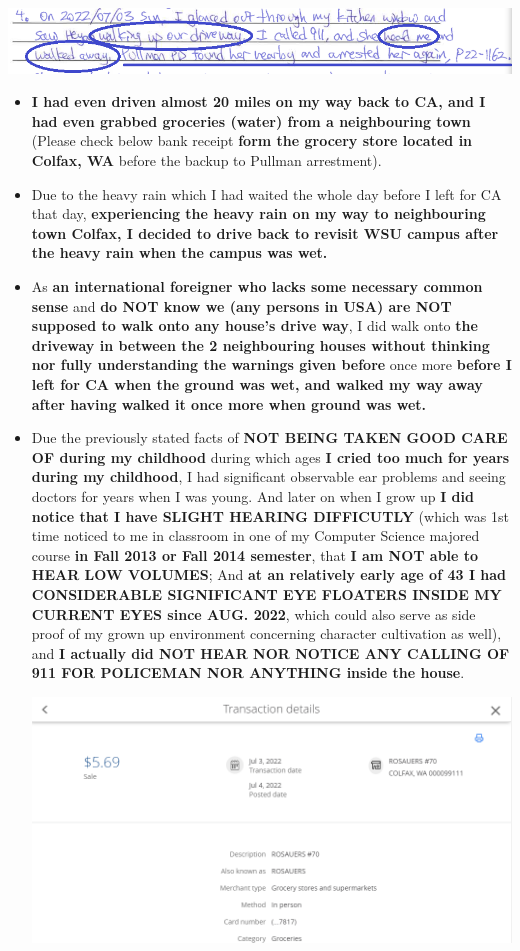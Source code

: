 \documentclass[9pt, b5paper]{article}
\begin{document}
\includegraphics[width=.9\linewidth]{./pic/dearCousin_20220920_142827.png}
\begin{itemize}
\item \textbf{I had even driven almost 20 miles on my way back to CA, and I had even grabbed groceries (water) from a neighbouring town} (Please check below bank receipt \textbf{form the grocery store located in Colfax, WA} before the backup to Pullman arrestment).
\item Due to the heavy rain which I had waited the whole day before I left for CA that day, \textbf{experiencing the heavy rain on my way to neighbouring town Colfax, I decided to drive back to revisit WSU campus after the heavy rain when the campus was wet.}
\item As \textbf{an international foreigner who lacks some necessary common sense} and \textbf{do NOT know we (any persons in USA) are NOT supposed to walk onto any house's drive way}, I did walk onto \textbf{the driveway in between the 2 neighbouring houses without thinking nor fully understanding the warnings given before} once more \textbf{before I left for CA when the ground was wet, and walked my way away after having walked it once more when ground was wet.}
\item Due the previously stated facts of \textbf{NOT BEING TAKEN GOOD CARE OF during my childhood} during which ages \textbf{I cried too much for years during my childhood}, I had significant observable ear problems and seeing doctors for years when I was young. And later on when I grow up \textbf{I did notice that I have SLIGHT HEARING DIFFICUTLY} (which was 1st time noticed to me in classroom in one of my Computer Science majored course \textbf{in Fall 2013 or Fall 2014 semester}, that \textbf{I am NOT able to HEAR LOW VOLUMES}; And \textbf{at an relatively early age of 43 I had CONSIDERABLE SIGNIFICANT EYE FLOATERS INSIDE MY CURRENT EYES since AUG. 2022}, which could also serve as side proof of my grown up environment concerning character cultivation as well), and \textbf{I actually did NOT HEAR NOR NOTICE ANY CALLING OF 911 FOR POLICEMAN NOR ANYTHING inside the house}. 

\includegraphics[width=.9\linewidth]{./pic/dearCousin_20220919_201117.png}
\end{itemize}
\end{document}
